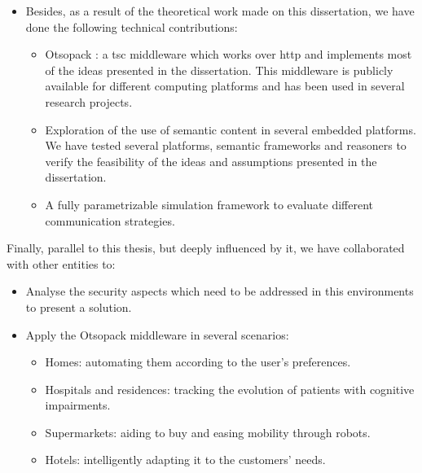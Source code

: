 \begin{itemize}
  \item Besides, as a result of the theoretical work made on this dissertation, we have done the following technical contributions:
    \begin{itemize}
      \item Otsopack : a \ac{tsc} middleware which works over \ac{http} and implements most of the ideas presented in the dissertation.
            This middleware is publicly available for different computing platforms and has been used in several research projects.
      \item Exploration of the use of semantic content in several embedded platforms.
	    We have tested several platforms, semantic frameworks and reasoners to verify the feasibility of the ideas and assumptions presented in the dissertation.
      \item A fully parametrizable simulation framework to evaluate different communication strategies. %
    \end{itemize}
\end{itemize}


Finally, parallel to this thesis, but deeply influenced by it, we have collaborated with other entities to:
\begin{itemize}
  \item Analyse the security aspects which need to be addressed in this environments to present a solution. %
  \item Apply the Otsopack middleware in several scenarios:
    \begin{itemize}
      \item Homes: automating them according to the user's preferences. %
      \item Hospitals and residences: tracking the evolution of patients with cognitive impairments.  %
      \item Supermarkets: aiding to buy and easing mobility through robots.
      \item Hotels: intelligently adapting it to the customers' needs.
    \end{itemize}
\end{itemize}